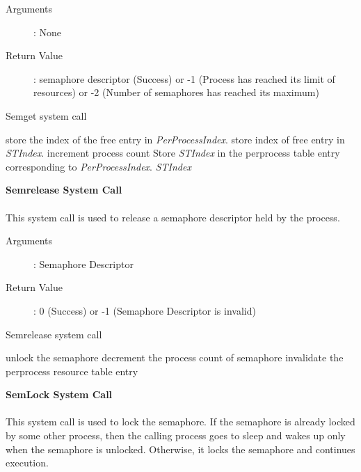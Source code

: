 \documentclass[10pt]{article}
\begin{document}
\begin{description}
\item[Arguments]: None
\item[Return Value]:  semaphore descriptor (Success) or -1 (Process has reached its limit of resources) or -2 (Number of semaphores has reached its maximum)
\end{description} 
\begin{algorithm}
\caption{Semget system call}
\begin{algorithmic}
\ELSE
    \STATE store the index of the free entry in \textit{PerProcessIndex}.
\ENDIF
{}
\ELSE
    \STATE store index of free entry in \textit{STIndex}.
    \STATE increment process count
\ENDIF
\STATE Store \textit{STIndex} in the per\-process table entry corresponding to \textit{PerProcessIndex}.
\RETURN \textit{STIndex}
\end{algorithmic}
\end{algorithm}
\textbf{Semrelease System Call}
\\ \\
This system call is used to release a semaphore descriptor held by the process.  
\begin{description}
\item[Arguments]: Semaphore Descriptor
\item[Return Value]: 0 (Success) or -1 (Semaphore Descriptor is invalid) 
\end{description} 
\begin{algorithm}
\caption{Semrelease system call}
\begin{algorithmic}
\ENDIF
{}
\ENDIF
{}
    \STATE unlock the semaphore
\ENDIF
\STATE decrement the process count of semaphore
\STATE invalidate the per\-process resource table entry 
\end{algorithmic}
\end{algorithm}
\vspace{3mm}
\textbf{SemLock System Call}
\\ \\
This system call is used to lock the semaphore. If the semaphore is already locked by some other process, then the calling process goes to sleep and wakes up only when the semaphore is unlocked. Otherwise, it locks the semaphore and continues execution. 
\end{document}
